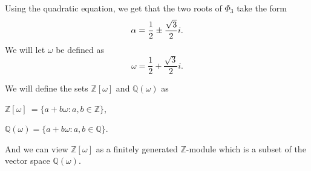 \documentclass[12pt]{amsart}
\theoremstyle{definition}
\theoremstyle{remark}
\begin{document}
Using the quadratic equation, we get that the two roots of $\Phi_3$ take the form 
\begin{equation}
    \notag\alpha = \frac{1}{2}\pm\frac{\sqrt{3}}{2}i.
\end{equation}
We will let $\omega$ be defined as 
\begin{equation}
    \omega = \frac{1}{2}+\frac{\sqrt{3}}{2}i.
\end{equation}

We will define the sets $\mathbb{Z}[\omega]$ and $\mathbb{Q}(\omega)$ as 

$\mathbb{Z}[\omega] \: = \{a + b\omega : a,b\in\mathbb{Z}\}$,

$\mathbb{Q}(\omega) = \{a + b\omega : a,b\in\mathbb{Q}\}$.

And we can view $\mathbb{Z}[\omega]$ as a finitely generated $\mathbb{Z}$-module which is a subset of the vector space $\mathbb{Q}(\omega)$. 
\end{document}
